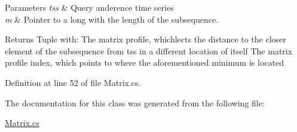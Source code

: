 \begin{DoxyParams}{Parameters}
{\em tss} & Query anderence time series\\
\hline
{\em m} & Pointer to a long with the length of the subsequence.\\
\hline
\end{DoxyParams}
\begin{DoxyReturn}{Returns}
Tuple with\+: The matrix profile, whichlects the distance to the closer element of the subsequence from \textquotesingle{}tss\textquotesingle{} in a different location of itself The matrix profile index, which points to where the aforementioned minimum is located
\end{DoxyReturn}


Definition at line 52 of file Matrix.\+cs.



The documentation for this class was generated from the following file\+:\begin{DoxyCompactItemize}
\item 
\mbox{\hyperlink{_matrix_8cs}{Matrix.\+cs}}\end{DoxyCompactItemize}
